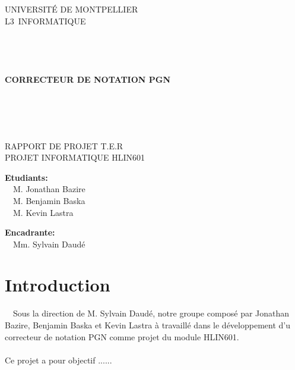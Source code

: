 \documentclass{article}
\begin{document}
\begin{center}
\linespread{2.0}\selectfont

{\Huge U}{\huge NIVERSITÉ DE }{\Huge M}{\huge ONTPELLIER}\\
{\huge L3}{\LARGE ~INFORMATIQUE }
\\~\\~\\~\\~\\
{\Large\textbf{CORRECTEUR DE NOTATION PGN}}
\\~\\~\\~\\~\\

\linespread{1}\selectfont

RAPPORT DE PROJET T.E.R\\
PROJET INFORMATIQUE HLIN601\\
\vfill
\end{center}
\begin{multicols}{2}
\begin{flushleft}
\textbf{Etudiants:}\\
~~M. Jonathan Bazire\\
~~M. Benjamin Baska\\
~~M. Kevin Lastra
\end{flushleft}
\columnbreak
\begin{flushright}
\textbf{Encadrante:}\\
~~Mm. Sylvain Daudé
\end{flushright}
\end{multicols}

\newpage
\setcounter{page}{1}
\tableofcontents
\newpage
\section{Introduction}
~~Sous la direction de M. Sylvain Daudé, notre groupe composé par Jonathan Bazire, Benjamin Baska et Kevin Lastra à travaillé dans le développement d'u correcteur de notation PGN comme projet du module HLIN601.
\\~\\
Ce projet a pour objectif ......

\newpage
\end{document}
